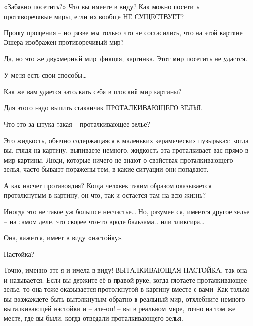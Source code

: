 \documentclass[../main.tex]{subfiles}
\begin{document}
\begin{Dialogue}
\begin{sublevel}
 «Забавно посетить?» Что вы имеете в виду? Как можно посетить противоречивые миры, если их вообще НЕ СУЩЕСТВУЕТ?

 Прошу прощения \--- но разве мы только что не согласились, что на этой картине Эшера изображен противоречивый мир?

 Да, но это же двухмерный мир, фикция, картинка. Этот мир посетить не удастся.

 У меня есть свои способы\ldots{}

 Как же вам удается затолкать себя в плоский мир картины?

 Для этого надо выпить стаканчик { ПРОТАЛКИВАЮЩЕГО} ЗЕЛЬЯ\@.

 Что это за штука такая \--- проталкивающее зелье?

 Это жидкость, обычно содержащаяся в маленьких керамических пузырьках; когда вы, глядя на картину, выпиваете немного, жидкость эта проталкивает вас прямо в мир картины. Люди, которые ничего не знают о свойствах проталкивающего зелья, часто бывают поражены тем, в какие ситуации они попадают.

 А как насчет противоядия? Когда человек таким образом оказывается протолкнутым в картину, он что, так и остается там на всю жизнь?

 Иногда это не такое уж большое несчастье\ldots{} Но, разумеется, имеется другое зелье \--- на самом деле, это скорее что-то вроде бальзама\ldots{} или эликсира\ldots{}


\begin{customlevel}{0}
     Она, кажется, имеет в виду «настойку».
\end{customlevel}


 Настойка?

 Точно, именно это я и имела в виду! { ВЫТАЛКИВАЮЩАЯ} НАСТОЙКА, так она и называется. Если вы держите её в правой руке, когда глотаете проталкивающее зелье, то она тоже оказывается протолкнутой в картину вместе с вами. Как только вы возжаждете быть вытолкнутым обратно в реальный мир, отхлебните немного выталкивающей настойки и \--- але-оп! \--- вы в реальном мире, точно на том же месте, где вы были, когда отведали проталкивающего зелья.


\end{sublevel}
\end{Dialogue}
\end{document}
